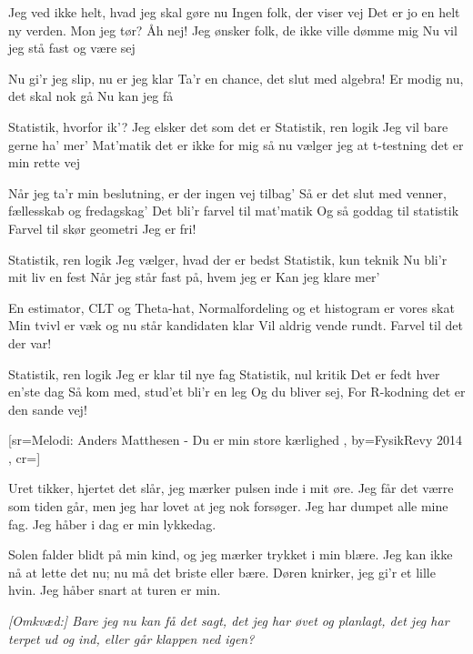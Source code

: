 \documentclass[pdftex,12pt]{article}
\begin{document}
\begin{songs}{}
\beginverse
Jeg ved ikke helt, hvad jeg skal gøre nu
Ingen folk, der viser vej
Det er jo en helt ny verden. Mon jeg tør? Åh nej!
Jeg ønsker folk, de ikke ville dømme mig
Nu vil jeg stå fast og være sej
\endverse

\beginverse
Nu gi'r jeg slip, nu er jeg klar
Ta'r en chance, det slut med algebra!
Er modig nu, det skal nok gå
Nu kan jeg få
\endverse

\beginverse
Statistik, hvorfor ik'?
Jeg elsker det som det er
Statistik, ren logik
Jeg vil bare gerne ha' mer'
Mat'matik det er ikke for mig
så nu vælger jeg
at t-testning det er min rette vej
\endverse

\beginverse
Når jeg ta'r min beslutning, er der ingen vej tilbag'
Så er det slut med venner, fællesskab og fredagskag'
Det bli'r farvel til mat'matik
Og så goddag til statistik
Farvel til skør geometri
Jeg er fri!
\endverse

\beginverse
Statistik, ren logik
Jeg vælger, hvad der er bedst
Statistik, kun teknik
Nu bli'r mit liv en fest
Når jeg står fast på, hvem jeg er
Kan jeg klare mer'
\endverse

\beginverse
En estimator, CLT og Theta-hat,
Normalfordeling og et histogram er vores skat
Min tvivl er væk og nu står kandidaten klar
Vil aldrig vende rundt. Farvel til det der var!
\endverse

\beginverse
Statistik, ren logik
Jeg er klar til nye fag
Statistik, nul kritik
Det er fedt hver en'ste dag
Så kom med, stud'et bli'r en leg
Og du bliver sej,
For R-kodning det er den sande vej!
\endverse
\endsong



﻿[sr={Melodi: Anders Matthesen - Du er min store kærlighed}
,
by={FysikRevy 2014}
,
cr={}]\hypertarget{Eksamensangst}{}
\label{song72}

\beginverse
Uret tikker, hjertet det slår,
jeg mærker pulsen inde i mit øre.
Jeg får det værre som tiden går,
men jeg har lovet at jeg nok forsøger.
Jeg har dumpet alle mine fag.
Jeg håber i dag er min lykkedag.
\endverse

\beginverse
Solen falder blidt på min kind,
og jeg mærker trykket i min blære.
Jeg kan ikke nå at lette det nu;
nu må det briste eller bære.
Døren knirker, jeg gi'r et lille hvin.
Jeg håber snart at turen er min.
\endverse

\beginverse
\emph{[Omkvæd:]
Bare jeg nu kan få det sagt,
det jeg har øvet og planlagt,
det jeg har terpet ud og ind,
eller går klappen ned igen?}
\endverse


\end{songs}
\end{document}
